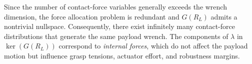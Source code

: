 \documentclass[letterpaper, 10 pt, conference]{ieeeconf}  %
\newcommand{\0}{\matr{0}}
\begin{document}

Since the number of contact-force variables generally exceeds the wrench dimension,
the force allocation problem is redundant and $G(R_L)$ admits a nontrivial nullspace.
Consequently, there exist infinitely many contact-force distributions that generate the
same payload wrench. The components of $\lambda$ in $\ker(G(R_L))$ correspond to
\emph{internal forces}, which do not affect the payload motion but influence grasp tensions,
actuator effort, and robustness margins.


\end{document}
